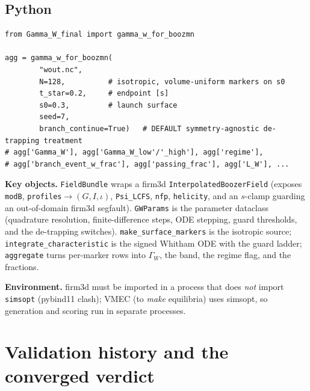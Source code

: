 \documentclass[11pt]{article}
\newcommand{\code}[1]{\texttt{#1}}
\newcommand{\GW}{\ensuremath{\Gamma_W}}
\newcommand{\ii}{\ensuremath{\iota}}
\begin{document}
\subsection{Python}
\begin{Verbatim}[fontsize=\small,frame=single,rulecolor=\color{gray}]
from Gamma_W_final import gamma_w_for_boozmn

agg = gamma_w_for_boozmn(
        "wout.nc",
        N=128,          # isotropic, volume-uniform markers on s0
        t_star=0.2,     # endpoint [s]
        s0=0.3,         # launch surface
        seed=7,
        branch_continue=True)   # DEFAULT symmetry-agnostic de-trapping treatment
# agg['Gamma_W'], agg['Gamma_W_low'/'_high'], agg['regime'],
# agg['branch_event_w_frac'], agg['passing_frac'], agg['L_W'], ...
\end{Verbatim}

\textbf{Key objects.} \code{FieldBundle} wraps a firm3d \code{InterpolatedBoozerField} (exposes
\code{modB}, \code{profiles}$\to(G,I,\ii)$, \code{Psi\_LCFS}, \code{nfp}, \code{helicity}, and an
$s$-clamp guarding an out-of-domain firm3d segfault). \code{GWParams} is the parameter dataclass
(quadrature resolution, finite-difference steps, ODE stepping, guard thresholds, and the
de-trapping switches). \code{make\_surface\_markers} is the isotropic source;
\code{integrate\_characteristic} is the signed Whitham ODE with the guard ladder;
\code{aggregate} turns per-marker rows into \GW, the band, the regime flag, and the fractions.

\textbf{Environment.} firm3d must be imported in a process that does \emph{not} import
\code{simsopt} (pybind11 clash); VMEC (to \emph{make} equilibria) uses simsopt, so generation and
scoring run in separate processes.

\section{Validation history and the converged verdict}
\label{sec:val}
\end{document}
